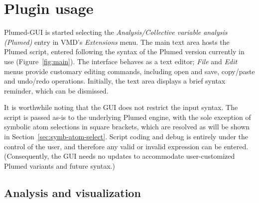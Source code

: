 \documentclass[preprint,review,11pt]{elsarticle}
\begin{document}





\section{Plugin usage}

Plumed-GUI is started selecting the \emph{Analysis/Collective variable
  analysis (Plumed)} entry in VMD's \emph{Extensions} menu. The main
text area hosts the Plumed script, entered following the syntax of the
Plumed version currently in use (Figure~\ref{fig:main}).  The
interface behaves as a text editor; \emph{File} and \emph{Edit} menus
provide customary editing commands, including open and save,
copy/paste and undo/redo operations.  Initially, the text area
displays a brief syntax reminder, which can be dismissed.


It is worthwhile noting that the GUI does not restrict the input
syntax. The script is passed as-is to the underlying Plumed engine,
with the sole exception of symbolic atom selections in square
brackets, which are resolved as will be shown in
Section~\ref{sec:symb-atom-select}.  Script coding and debug is
entirely under the control of the user, and therefore any valid or
invalid expression can be entered.  (Consequently, the GUI needs no
updates to accommodate user-customized Plumed variants and future
syntax.)




\subsection{Analysis and visualization}
\end{document}
